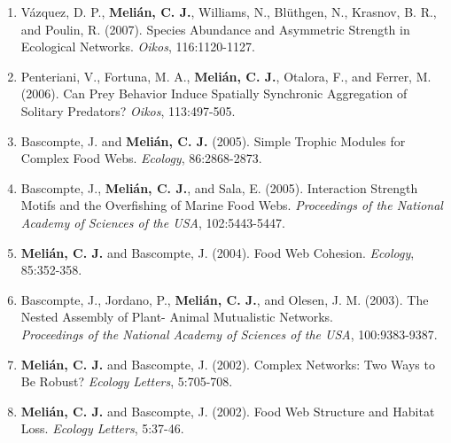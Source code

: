 \documentclass[12pt]{article}
\begin{document}
\begin{flushleft}
\begin{enumerate}
\item V\'azquez, D. P., {\bf Meli\'an, C. J.}, Williams, N., Bl\"uthgen, N., Krasnov, B. R., and Poulin, R. (2007). Species Abundance and Asymmetric Strength in Ecological Networks. {\em Oikos}, 116:1120-1127.\\
\item Penteriani, V., Fortuna, M. A., {\bf Meli\'an, C. J.}, Otalora, F., and Ferrer, M. (2006). Can Prey Behavior Induce Spatially Synchronic Aggregation of Solitary Predators? {\em Oikos}, 113:497-505.\\
\item Bascompte, J. and {\bf Meli\'an, C. J.} (2005). Simple Trophic Modules for Complex Food Webs. {\em Ecology}, 86:2868-2873.\\
\item Bascompte, J., {\bf Meli\'an, C. J.}, and Sala, E. (2005). Interaction Strength Motifs and the Overfishing of Marine Food Webs. {\em Proceedings of the National Academy of Sciences of the USA}, 102:5443-5447.\\
\item {\bf Meli\'an, C. J.} and Bascompte, J. (2004). Food Web Cohesion. {\em Ecology}, 85:352-358.\\
\item Bascompte, J., Jordano, P., {\bf Meli\'an, C. J.}, and Olesen, J. M. (2003). The Nested Assembly of Plant- Animal Mutualistic Networks.\\ {\em Proceedings of the National Academy of Sciences of the USA}, 100:9383-9387.\\
\item {\bf Meli\'an, C. J.} and Bascompte, J. (2002). Complex Networks: Two Ways to Be Robust? {\em Ecology Letters}, 5:705-708.\\
\item {\bf Meli\'an, C. J.} and Bascompte, J. (2002). Food Web Structure and Habitat Loss. {\em Ecology Letters}, 5:37-46.\\


\end{enumerate}
\end{flushleft}
\end{document}

